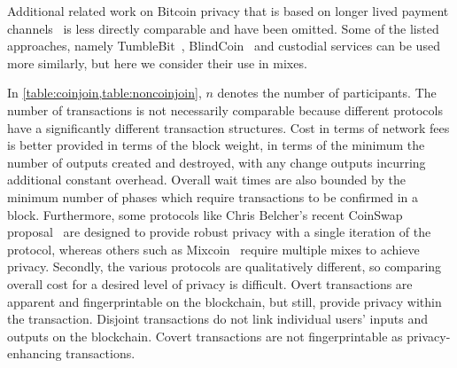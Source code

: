 \documentclass[a4paper]{article}
\begin{document}
Additional related work on Bitcoin privacy that is based on longer lived payment channels~\cite{green2017bolt, tairi2019a2l} is less directly comparable and have been omitted. Some of the listed approaches, namely TumbleBit~\cite{heilman2017tumblebit}, BlindCoin~\cite{valenta2015blindcoin} and custodial services can be used more similarly, but here we consider their use in mixes.

In \cref{table:coinjoin,table:noncoinjoin}, $n$ denotes the number of participants. The number of transactions is not necessarily comparable because different protocols have a significantly different transaction structures. Cost in terms of network fees is better provided in terms of the block weight, in terms of the minimum the number of outputs created and destroyed, with any change outputs incurring additional constant overhead. Overall wait times are also bounded by the minimum number of phases which require transactions to be confirmed in a block. Furthermore, some protocols like Chris Belcher's recent CoinSwap proposal~\cite{belcher2020design} are designed to provide robust privacy with a single iteration of the protocol, whereas others such as Mixcoin~\cite{bonneau2014mixcoin} require multiple mixes to achieve privacy. Secondly, the various protocols are qualitatively different, so comparing overall cost for a desired level of privacy is difficult. Overt transactions are apparent and fingerprintable on the blockchain, but still, provide privacy within the transaction. Disjoint transactions do not link individual users' inputs and outputs on the blockchain. Covert transactions are not fingerprintable as privacy-enhancing transactions.
\end{document}
